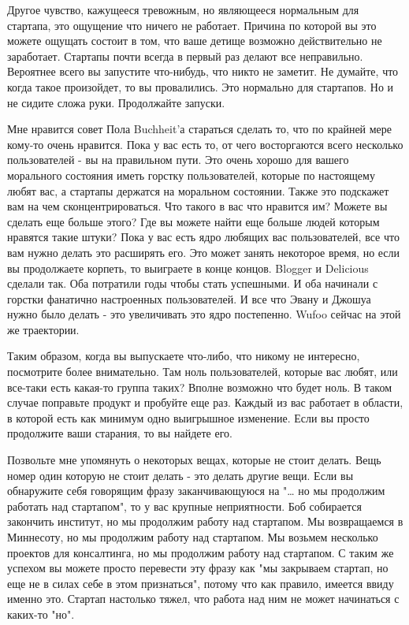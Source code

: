 \documentclass[ebook,12pt,oneside,openany]{memoir}
\begin{document}
Другое чувство, кажущееся тревожным, но являющееся нормальным для
стартапа, это ощущение что ничего не работает. Причина по которой вы
это можете ощущать состоит в том, что ваше детище возможно
действительно не заработает. Стартапы почти всегда в первый раз делают
все неправильно. Вероятнее всего вы запустите что-нибудь, что никто не
заметит. Не думайте, что когда такое произойдет, то вы провалились.
Это нормально для стартапов. Но и не сидите сложа руки. Продолжайте
запуски.

Мне нравится совет Пола Buchheit'а стараться сделать то, что по
крайней мере кому-то очень нравится. Пока у вас есть то, от чего
восторгаются всего несколько пользователей - вы на правильном пути.
Это очень хорошо для вашего морального состояния иметь горстку
пользователей, которые по настоящему любят вас, а стартапы держатся на
моральном состоянии. Также это подскажет вам на чем
сконцентрироваться. Что такого в вас что нравится им? Можете вы
сделать еще больше этого? Где вы можете найти еще больше людей которым
нравятся такие штуки? Пока у вас есть ядро любящих вас пользователей,
все что вам нужно делать это расширять его. Это может занять некоторое
время, но если вы продолжаете корпеть, то выиграете в конце концов.
Blogger и Delicious сделали так. Оба потратили годы чтобы стать
успешными. И оба начинали с горстки фанатично настроенных
пользователей. И все что Эвану и Джошуа нужно было делать - это
увеличивать это ядро постепенно. Wufoo сейчас на этой же траектории.

Таким образом, когда вы выпускаете что-либо, что никому не интересно,
посмотрите более внимательно. Там ноль пользователей, которые вас
любят, или все-таки есть какая-то группа таких? Вполне возможно что
будет ноль. В таком случае поправьте продукт и пробуйте еще раз.
Каждый из вас работает в области, в которой есть как минимум одно
выигрышное изменение. Если вы просто продолжите ваши старания, то вы
найдете его.

Позвольте мне упомянуть о некоторых вещах, которые не стоит делать.
Вещь номер один которую не стоит делать - это делать другие вещи. Если
вы обнаружите себя говорящим фразу заканчивающуюся на "… но мы
продолжим работать над стартапом", то у вас крупные неприятности. Боб
собирается закончить институт, но мы продолжим работу над стартапом.
Мы возвращаемся в Миннесоту, но мы продолжим работу над стартапом. Мы
возьмем несколько проектов для консалтинга, но мы продолжим работу над
стартапом. С таким же успехом вы можете просто перевести эту фразу как
"мы закрываем стартап, но еще не в силах себе в этом признаться",
потому что как правило, имеется ввиду именно это. Стартап настолько
тяжел, что работа над ним не может начинаться с каких-то "но".
\end{document}
